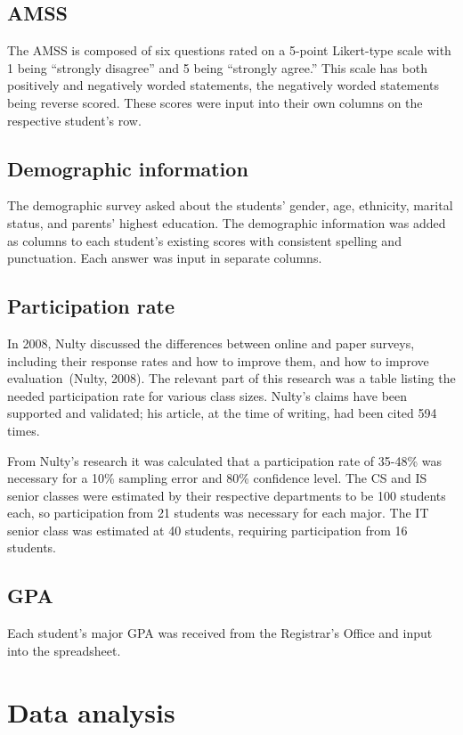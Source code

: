 \subsection{AMSS}
The AMSS is composed of six questions rated on a 5-point Likert-type scale with 1 being ``strongly disagree'' and 5 being ``strongly agree.'' This scale has both positively and negatively worded statements, the negatively worded statements being reverse scored. These scores were input into their own columns on the respective student's row.

\subsection{Demographic information}
The demographic survey asked about the students' gender, age, ethnicity, marital status, and parents' highest education. The demographic information was added as columns to each student's existing scores with consistent spelling and punctuation. Each answer was input in separate columns.

\subsection{Participation rate}
In 2008, Nulty discussed the differences between online and paper surveys, including their response rates and how to improve them, and how to improve evaluation~(Nulty, 2008). The relevant part of this research was a table listing the needed participation rate for various class sizes. Nulty's claims have been supported and validated; his article, at the time of writing, had been cited 594 times.

From Nulty's research it was calculated that a participation rate of 35-48\% was necessary for a 10\% sampling error and 80\% confidence level. The CS and IS senior classes were estimated by their respective departments to be 100 students each, so participation from 21 students was necessary for each major. The IT senior class was estimated at 40 students, requiring participation from 16 students.

\subsection{GPA}
Each student's major GPA was received from the Registrar's Office and input into the spreadsheet.

\section{Data analysis}
